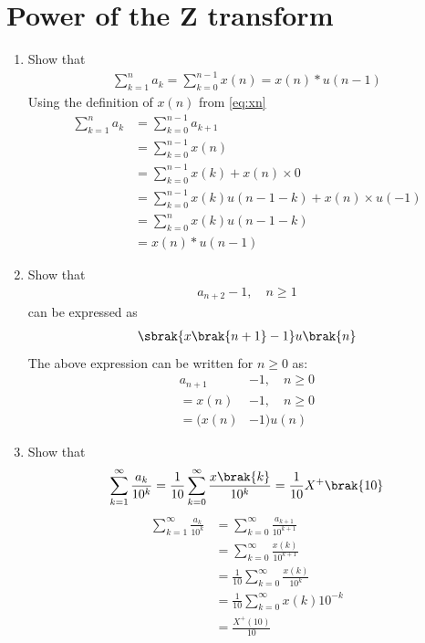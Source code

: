 \documentclass[journal,12pt,twocolumn]{IEEEtran}
\renewcommand\thesection{\arabic{section}}
\begin{document}
\section{Power of the Z transform}
\begin{enumerate}[label=\thesection.\arabic*,ref=\thesection.\theenumi]
\item Show that 
\begin{align}
	\sum_{k=1}^{n}a_k = 
	\sum_{k=0}^{n-1}x(n) = x(n)*u(n-1)
\end{align}
\solution Using the definition of $x(n)$ from \eqref{eq:xn}\begin{align}
    \sum_{k=1}^na_k &= \sum_{k=0}^{n-1}a_{k+1}\\
    &= \sum_{k=0}^{n-1}x(n)\\
    &= \sum_{k=0}^{n-1}x(k)+x(n)\times0\\
    &= \sum_{k=0}^{n-1}x(k)u(n-1-k)+x(n)\times u(-1)\\
    &= \sum_{k=0}^{n}x(k)u(n-1-k)\\
    &= x(n)*u(n-1) \label{eq:ak}
\end{align}

\item Show that 
\begin{align}
a_{n+2}-1, \quad n \ge 1
\end{align}
can be expressed as 
\begin{align}
	\sbrak{x\brak{n+1}-1}u\brak{n}
\end{align}
\solution The above expression can be written for $n\geq0$ as:
\begin{align}
    a_{n+1}&-1, \quad n\ge0\\
    = x(n)&-1, \quad n\ge0\\
    = (x(n)&-1)u(n)
\end{align}


 \item Show that 
\begin{align}
	\sum_{k=1}^{\infty}\frac{a_k}{10^k}= 
	\frac{1}{10}\sum_{k=0}^{\infty}\frac{x\brak{k}}{10^k} =\frac{1}{10}X^{+}\brak{{10}}
\end{align}
\solution\begin{align}
    	\sum_{k=1}^{\infty}\frac{a_k}{10^k}&=\sum_{k=0}^{\infty}\frac{a_{k+1}}{10^{k+1}}\\
    	&= \sum_{k=0}^{\infty}\frac{x(k)}{10^{k+1}}\\
        &=\frac{1}{10}\sum_{k=0}^{\infty}\frac{x(k)}{10^{k}}\\
        &=\frac{1}{10}\sum_{k=0}^{\infty}x(k)10^{-k}\\
        &= \frac{X^+(10)}{10}\label{eq:az10}
\end{align}


\end{enumerate}
\end{document}
